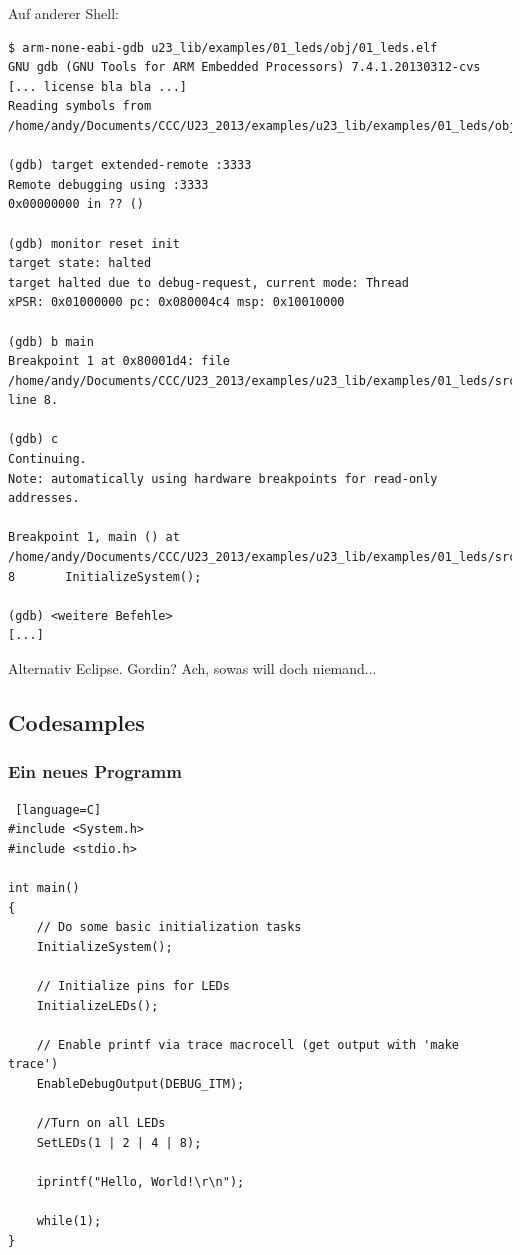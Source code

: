 \documentclass[ngerman,compress]{beamer}
\begin{document}
\begin{frame} [fragile]
Auf anderer Shell:
	\begin{lstlisting}
$ arm-none-eabi-gdb u23_lib/examples/01_leds/obj/01_leds.elf 
GNU gdb (GNU Tools for ARM Embedded Processors) 7.4.1.20130312-cvs
[... license bla bla ...]
Reading symbols from /home/andy/Documents/CCC/U23_2013/examples/u23_lib/examples/01_leds/obj/01_leds.elf...done.

(gdb) target extended-remote :3333
Remote debugging using :3333
0x00000000 in ?? ()

(gdb) monitor reset init
target state: halted
target halted due to debug-request, current mode: Thread 
xPSR: 0x01000000 pc: 0x080004c4 msp: 0x10010000

(gdb) b main
Breakpoint 1 at 0x80001d4: file /home/andy/Documents/CCC/U23_2013/examples/u23_lib/examples/01_leds/src/main.c, line 8.

(gdb) c
Continuing.
Note: automatically using hardware breakpoints for read-only addresses.

Breakpoint 1, main () at /home/andy/Documents/CCC/U23_2013/examples/u23_lib/examples/01_leds/src/main.c:8
8		InitializeSystem();

(gdb) <weitere Befehle> 
[...]
	\end{lstlisting}
	Alternativ Eclipse. Gordin? Ach, sowas will doch niemand...
\end{frame}

\subsection{Codesamples}

\begin{frame}[fragile]
	\frametitle{Ein neues Programm}
	\begin{lstlisting} [language=C]
#include <System.h>
#include <stdio.h>

int main()
{
    // Do some basic initialization tasks
    InitializeSystem();

    // Initialize pins for LEDs
    InitializeLEDs();

    // Enable printf via trace macrocell (get output with 'make trace')
    EnableDebugOutput(DEBUG_ITM);

    //Turn on all LEDs
    SetLEDs(1 | 2 | 4 | 8);

    iprintf("Hello, World!\r\n");

    while(1);
}
	\end{lstlisting}
\end{frame}
\end{document}
